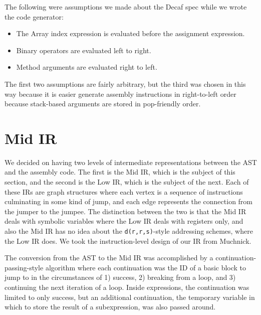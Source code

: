 \documentclass[11pt]{article}
\begin{document}
The following were assumptions we made about the Decaf spec while we
wrote the code generator: 

\begin{itemize}
\item The Array index expression is evaluated before the assignment expression. 
\item Binary operators are evaluated left to right.
\item Method arguments are evaluated right to left.
\end{itemize}

The first two assumptions are fairly arbitrary, but the third was
chosen in this way because it is easier generate assembly instructions
in right-to-left order because stack-based arguments are stored in
pop-friendly order.

\section {Mid IR}
\label{sec:midir}

We decided on having two levels of intermediate representations
between the AST and the assembly code.  The first is the Mid IR, which
is the subject of this section, and the second is the Low IR, which is
the subject of the next.  Each of these IRs are graph structures where
each vertex is a sequence of instructions culminating in some kind of
jump, and each edge represents the connection from the jumper to the
jumpee.  The distinction between the two is that the Mid IR deals with
symbolic variables where the Low IR deals with registers only, and
also the Mid IR has no idea about the \texttt{d(r,r,s)}-style
addressing schemes, where the Low IR does.  We took the
instruction-level design of our IR from Muchnick.

The conversion from the AST to the Mid IR was accomplished by a
continuation-passing-style algorithm where each continuation was the
ID of a basic block to jump to in the circumstances of 1) success, 2)
breaking from a loop, and 3) continuing the next iteration of a loop.
Inside expressions, the continuation was limited to only success, but
an additional continuation, the temporary variable in which to store
the result of a subexpression, was also passed around.
\end{document}
